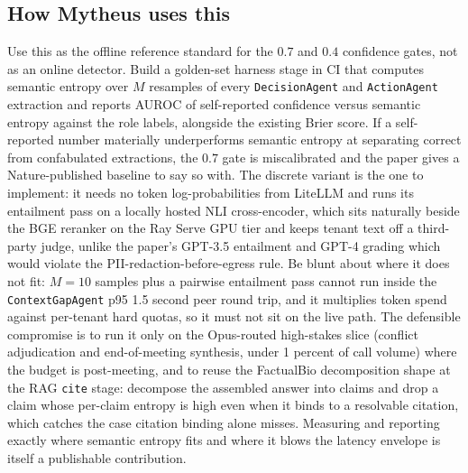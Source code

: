 \subsection{How Mytheus uses this}
\begin{takeaway}
Use this as the offline reference standard for the $0.7$ and $0.4$ confidence gates, not as an online detector. Build a golden-set harness stage in CI that computes semantic entropy over $M$ resamples of every \texttt{DecisionAgent} and \texttt{ActionAgent} extraction and reports AUROC of self-reported confidence versus semantic entropy against the role labels, alongside the existing Brier score. If a self-reported number materially underperforms semantic entropy at separating correct from confabulated extractions, the $0.7$ gate is miscalibrated and the paper gives a Nature-published baseline to say so with. The discrete variant is the one to implement: it needs no token log-probabilities from LiteLLM and runs its entailment pass on a locally hosted NLI cross-encoder, which sits naturally beside the BGE reranker on the Ray Serve GPU tier and keeps tenant text off a third-party judge, unlike the paper's GPT-3.5 entailment and GPT-4 grading which would violate the PII-redaction-before-egress rule. Be blunt about where it does not fit: $M{=}10$ samples plus a pairwise entailment pass cannot run inside the \texttt{ContextGapAgent} p95 1.5 second peer round trip, and it multiplies token spend against per-tenant hard quotas, so it must not sit on the live path. The defensible compromise is to run it only on the Opus-routed high-stakes slice (conflict adjudication and end-of-meeting synthesis, under 1 percent of call volume) where the budget is post-meeting, and to reuse the FactualBio decomposition shape at the RAG \texttt{cite} stage: decompose the assembled answer into claims and drop a claim whose per-claim entropy is high even when it binds to a resolvable citation, which catches the case citation binding alone misses. Measuring and reporting exactly where semantic entropy fits and where it blows the latency envelope is itself a publishable contribution.
\end{takeaway}

